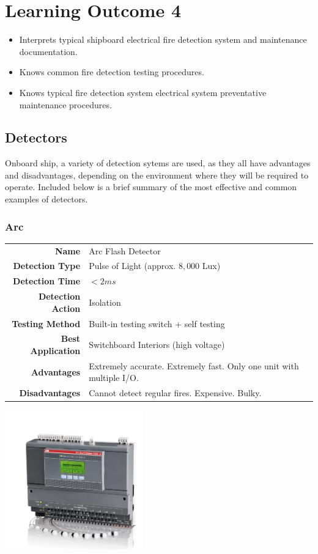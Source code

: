 \documentclass[11pt,a4paper]{article}
\begin{document}
\section{Learning Outcome 4}
\begin{tcolorbox}[colback=red!5!white,colframe=red!75!black,title=\textbf{Demonstrate knowledge of the basic maintenance requirements of ships fire detection systems}]
\begin{itemize}
\item Interprets typical shipboard electrical fire detection system and maintenance documentation.
\item Knows common fire detection testing procedures.
\item Knows typical fire detection system electrical system preventative maintenance procedures.
\end{itemize}
\end{tcolorbox}
\subsection{Detectors}
Onboard ship, a variety of detection sytems are used, as they all have advantages and disadvantages, depending on the environment where they will be required to operate. Included below is a brief summary of the most effective and common examples of detectors.
\subsubsection{Arc}
\begin{tabular}{|r|l|}
\hline
\textbf{Name} & Arc Flash Detector \\
\textbf{Detection Type} & Pulse of Light (approx. $8,000$ Lux\cite{lux}) \\
\textbf{Detection Time} & $<2ms$ \\
\textbf{Detection Action} & Isolation \\
\textbf{Testing Method} & Built-in testing switch + self testing \\
\textbf{Best Application} & Switchboard Interiors (high voltage) \\
\textbf{Advantages} & Extremely accurate. Extremely fast. Only one unit with multiple I/O. \\
\textbf{Disadvantages} & Cannot detect regular fires. Expensive. Bulky. \\
\hline
\end{tabular}
\begin{center}
\includegraphics[width=6cm]{arcdetector}
\end{center}
\end{document}
